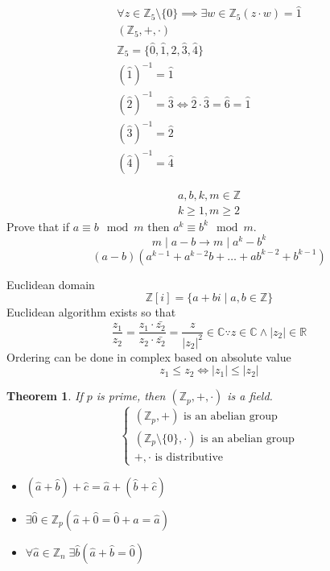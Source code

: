 \documentclass[letterpaper, 12pt]{article}
\newtheorem{theorem}{Theorem}[section]
\newenvironment{definition}[1][Definition]{\begin{trivlist}
\item[\hskip \labelsep {\bfseries #1}]}{\end{trivlist}}
\newenvironment{example}[1][Example]{\begin{trivlist}
\item[\hskip \labelsep {\bfseries #1}]}{\end{trivlist}}
\newcommand{\then}{\rightarrow}
\newcommand{\Z}{\mathbb{Z}}
\newcommand{\R}{\mathbb{R}}
\newcommand{\C}{\mathbb{C}}
\newcommand{\0}{\emptyset}
\begin{document}
    \begin{example}
        \begin{gather*}
            \forall z \in \Z_5 \setminus \{0\} \implies \exists w \in \Z_5(z \cdot w) = \hat{1} \\
            (\Z_5, +, \cdot) \\
            \Z_5 = \{\hat{0}, \hat{1}, \hat{2}, \hat{3}, \hat{4}\} \\
            (\hat{1})^{-1} = \hat{1} \\
            (\hat{2})^{-1} = \hat{3} \iff \hat{2} \cdot \hat{3} = \hat{6} = \hat{1} \\
            (\hat{3})^{-1} = \hat{2} \\
            (\hat{4})^{-1} = \hat{4}
        \end{gather*}
    \end{example}
    \begin{example}
        \begin{gather*}
            a, b, k, m \in \Z \\
            k \ge 1, m \ge 2
        \end{gather*}
        Prove that if $a \equiv b \mod m$ then $a^k \equiv b^k \mod m$.
        \[m \mid a - b \then m \mid a^k - b^k\]
        \[(a - b)(a^{k-1} + a^{k-2}b + \dots + ab^{k-2} +b^{k-1})\]
    \end{example}
    \begin{definition}
        Euclidean domain
        \[\Z[i] = \{a+bi \mid a,b \in \Z\}\]
        Euclidean algorithm exists so that 
        \[\frac{z_1}{z_2} = \frac{z_1 \cdot \bar{z_2}}{z_2 \cdot \bar{z_2}} 
        = \frac{z}{|z_2|^2} \in \C \because z \in \C \wedge |z_2| \in \R\]
        Ordering can be done in complex based on absolute value
        \[z_1 \le z_2 \iff |z_1| \le |z_2|\]
    \end{definition}
    \begin{theorem}
        If $p$ is prime, then $(\Z_p, +, \cdot)$ is a field.
        \[\begin{cases}
            (\Z_p, +) \text{ is an abelian group} \\
            (\Z_p \setminus \{0\}, \cdot) \text{ is an abelian group} \\
            +, \cdot \text{ is distributive}
        \end{cases}\]
        \begin{itemize}
            \item $(\hat{a} + \hat{b}) + \hat{c} = \hat{a} + (\hat{b} + \hat{c})$
            \item $\exists \hat{0} \in \Z_p (\hat{a} + \hat{0} = \hat{0} + \hat{a} = \hat{a})$
            \item $\forall \hat{a} \in \Z_n \; \exists \hat{b} (\hat{a} + \hat{b} = \hat{0})$
        \end{itemize}
    \end{theorem}
\end{document}
